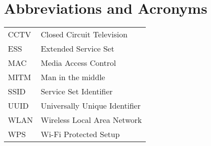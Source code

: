 \chapter*{Abbreviations and Acronyms}


\noindent
\begin{longtable}{@{}p{}p{}@{}}
CCTV & Closed Circuit Television \\
ESS & Extended Service Set \\
MAC & Media Access Control \\
MITM & Man in the middle \\
SSID & Service Set Identifier \\
UUID & Universally Unique Identifier \\
WLAN & Wireless Local Area Network \\
WPS & Wi-Fi Protected Setup \\
\end{longtable}
